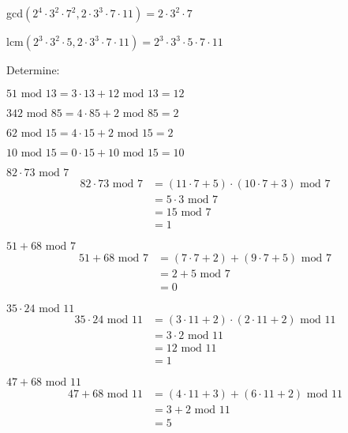 \documentclass[11pt,largemargins]{homework}
\begin{document}
\begin{alphaparts}
    \questionpart
    gcd$(2^4 \cdot 3^2 \cdot 7^2, 2 \cdot 3^3 \cdot 7 \cdot 11) = 2 \cdot 3^2 \cdot 7$

    \questionpart
    lcm$(2^3 \cdot 3^2 \cdot 5, 2 \cdot 3^3 \cdot 7 \cdot 11) = 2^3 \cdot 3^3 \cdot 5 \cdot 7 \cdot 11$

\end{alphaparts}

\question 
Determine:

\begin{alphaparts}
    \questionpart $51\text{ mod }13 = 3\cdot13+ 12\text{ mod }13=12$
    
    \questionpart $342\text{ mod }85 = 4\cdot85+ 2\text{ mod }85=2$
    
    \questionpart $62\text{ mod }15 = 4\cdot15+ 2\text{ mod }15=2$

    \questionpart $10\text{ mod }15 = 0\cdot15+ 10\text{ mod }15=10$

    \questionpart $82\cdot73\text{ mod }7$
    \begin{align*}
        82\cdot73\text{ mod }7 &= (11\cdot7+5)\cdot(10\cdot7+3)\text{ mod }7\\
                               &= 5 \cdot 3 \text{ mod }7\\
                               &= 15\text{ mod }7\\
                               &= 1
    \end{align*}

    \questionpart $51+68\text{ mod }7 $
    \begin{align*}
        51+68\text{ mod }7 &= (7\cdot7+2)+(9\cdot7+5)\text{ mod }7\\
                               &= 2 + 5 \text{ mod }7\\
                               &= 0
    \end{align*}

    \questionpart $35\cdot24\text{ mod }11 $
    \begin{align*}
        35\cdot24\text{ mod }11 &= (3\cdot11+2)\cdot(2\cdot11+2)\text{ mod }11\\
                               &= 3 \cdot 2 \text{ mod }11\\
                               &= 12 \text{ mod }11\\
                               &= 1
    \end{align*}

    \questionpart $47+68\text{ mod }11 $
    \begin{align*}
        47+68\text{ mod }11 &= (4\cdot11+3)+(6\cdot11+2)\text{ mod }11\\
                               &= 3 + 2 \text{ mod }11\\
                               &= 5
    \end{align*}

\end{alphaparts}
\end{document}
